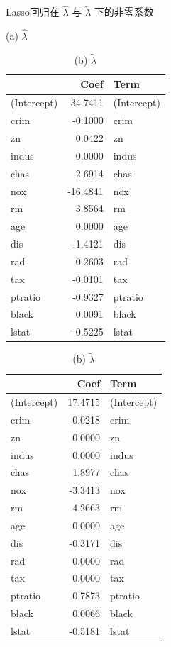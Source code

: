 \documentclass[12pt, a4paper, oneside]{ctexart}
\begin{document}
\begin{appendices}
\begin{table}[htbp]
		\end{table}
		
		\begin{table}[htbp]
			\centering
			\caption{Lasso回归在 $\hat{\lambda}$ 与 $\tilde{\lambda}$ 下的非零系数}
			\vspace{1em}
			
			\begin{minipage}{0.48\textwidth}
				\centering
				\caption*{(a) $\hat{\lambda}$}
				\begin{tabular}{l r l}
					\toprule
					& Coef & Term \\
					\midrule
					(Intercept) & 34.7411 & (Intercept)\\
					crim & -0.1000 & crim\\
					zn & 0.0422 & zn\\
					indus & 0.0000 & indus\\
					chas & 2.6914 & chas\\
					\addlinespace
					nox & -16.4841 & nox\\
					rm & 3.8564 & rm\\
					age & 0.0000 & age\\
					dis & -1.4121 & dis\\
					rad & 0.2603 & rad\\
					\addlinespace
					tax & -0.0101 & tax\\
					ptratio & -0.9327 & ptratio\\
					black & 0.0091 & black\\
					lstat & -0.5225 & lstat\\
					\bottomrule
				\end{tabular}
			\end{minipage}
			\hfill
			\begin{minipage}{0.48\textwidth}
				\centering
				\caption*{(b) $\tilde{\lambda}$}
				\begin{tabular}{l r l}
					\toprule
					& Coef & Term \\
					\midrule
					(Intercept) & 17.4715 & (Intercept)\\
					crim & -0.0218 & crim\\
					zn & 0.0000 & zn\\
					indus & 0.0000 & indus\\
					chas & 1.8977 & chas\\
					\addlinespace
					nox & -3.3413 & nox\\
					rm & 4.2663 & rm\\
					age & 0.0000 & age\\
					dis & -0.3171 & dis\\
					rad & 0.0000 & rad\\
					\addlinespace
					tax & 0.0000 & tax\\
					ptratio & -0.7873 & ptratio\\
					black & 0.0066 & black\\
					lstat & -0.5181 & lstat\\
					\bottomrule
				\end{tabular}
			\end{minipage}
			

\end{table}
\end{appendices}
\end{document}
